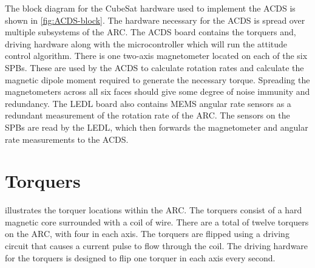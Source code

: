 The block diagram for the CubeSat hardware used to implement the \ac{ACDS} is shown in \cref{fig:ACDS-block}. The hardware necessary for the \ac{ACDS} is spread over multiple subsystems of the \ac{ARC}. The \ac{ACDS} board contains the torquers and, driving hardware along with the microcontroller which will run the attitude control algorithm. There is one two-axis magnetometer located on each of the six \acp{SPB}. These are used by the \ac{ACDS} to calculate rotation rates and calculate the magnetic dipole moment required to generate the necessary torque. Spreading the magnetometers across all six faces should give some degree of noise immunity and redundancy. The \ac{LEDL} board also contains \ac{MEMS} angular rate sensors as a redundant measurement of the rotation rate of the \ac{ARC}. The sensors on the \acp{SPB} are read by the \ac{LEDL}, which then forwards the magnetometer and angular rate measurements to the \ac{ACDS}.

\section{Torquers}

 illustrates the torquer locations within the \ac{ARC}. The torquers consist of a hard magnetic core surrounded with a coil of wire. There are a total of twelve torquers on the \ac{ARC}, with four in each axis. The torquers are flipped using a driving circuit that causes a current pulse to flow through the coil. The driving hardware for the torquers is designed to flip one torquer in each axis every second.

